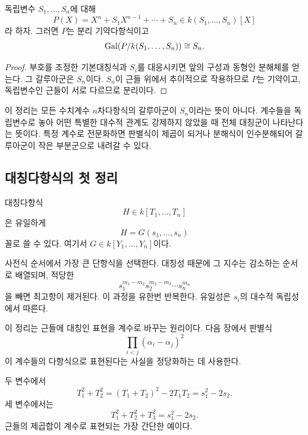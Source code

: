 \begin{corollary}
독립변수 $S_1,\dots,S_n$에 대해
\[
  P(X)=X^n+S_1X^{n-1}+\cdots+S_n
  \in k(S_1,\dots,S_n)[X]
\]
라 하자. 그러면 $P$는 분리 기약다항식이고
\[
  \operatorname{Gal}(P/k(S_1,\dots,S_n))\cong S_n.
\]
\end{corollary}

\begin{proof}
부호를 조정한 기본대칭식과 $S_i$를 대응시키면 앞의 구성과 동형인 분해체를 얻는다. 그 갈루아군은 $S_n$이다. $S_n$이 근들 위에서 추이적으로 작용하므로 $P$는 기약이고, 독립변수인 근들이 서로 다르므로 분리이다.
\end{proof}

\begin{remark}
이 정리는 모든 수치계수 $n$차다항식의 갈루아군이 $S_n$이라는 뜻이 아니다. 계수들을 독립변수로 놓아 어떤 특별한 대수적 관계도 강제하지 않았을 때 전체 대칭군이 나타난다는 뜻이다. 특정 계수로 전문화하면 판별식이 제곱이 되거나 분해식이 인수분해되어 갈루아군이 작은 부분군으로 내려갈 수 있다.
\end{remark}

\subsection{대칭다항식의 첫 정리}

\begin{theorem}[기본대칭식 정리: 체 계수 버전]
대칭다항식
\[
  H\in k[T_1,\dots,T_n]
\]
은 유일하게
\[
  H=G(s_1,\dots,s_n)
\]
꼴로 쓸 수 있다. 여기서 $G\in k[Y_1,\dots,Y_n]$이다.
\end{theorem}

\begin{proofidea}
사전식 순서에서 가장 큰 단항식을 선택한다. 대칭성 때문에 그 지수는 감소하는 순서로 배열되며, 적당한
\[
  s_1^{m_1-m_2}s_2^{m_2-m_3}\cdots s_n^{m_n}
\]
을 빼면 최고항이 제거된다. 이 과정을 유한번 반복한다. 유일성은 $s_i$의 대수적 독립성에서 따른다.
\end{proofidea}

이 정리는 근들에 대칭인 표현을 계수로 바꾸는 원리이다. 다음 장에서 판별식
\[
  \prod_{i<j}(\alpha_i-\alpha_j)^2
\]
이 계수들의 다항식으로 표현된다는 사실을 정당화하는 데 사용한다.

\begin{example}
두 변수에서
\[
  T_1^2+T_2^2
  =(T_1+T_2)^2-2T_1T_2
  =s_1^2-2s_2.
\]
세 변수에서는
\[
  T_1^2+T_2^2+T_3^2=s_1^2-2s_2.
\]
근들의 제곱합이 계수로 표현되는 가장 간단한 예이다.
\end{example}

